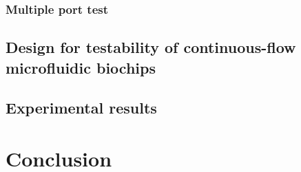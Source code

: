 \documentclass{article}
\begin{document}
    \subsubsection{Multiple port test}
    
  \subsection{Design for testability of continuous-flow microfluidic biochips}

  \subsection{Experimental results}

\section{Conclusion}
\end{document}
